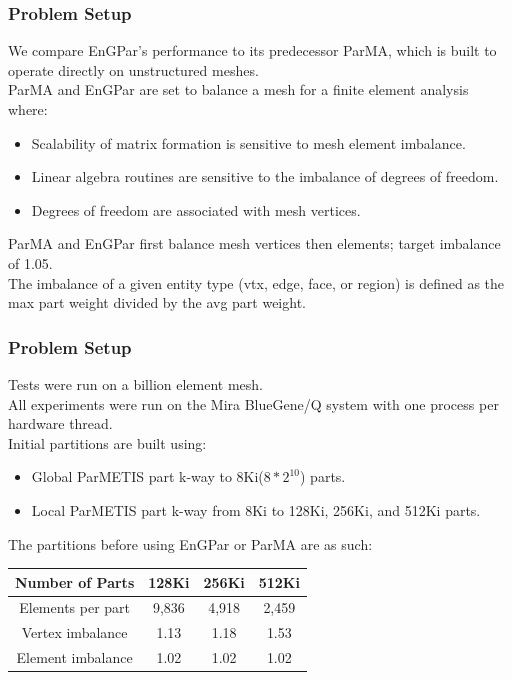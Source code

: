 \documentclass{beamer}
\begin{document}
\begin{frame}
  \frametitle{Problem Setup}
  We compare EnGPar's performance to its predecessor ParMA, which is built to operate directly on unstructured meshes.\\
  \medskip
  ParMA and EnGPar are set to balance a mesh for a finite element analysis where:
  \begin{itemize}
  \item Scalability of matrix formation is sensitive to mesh element imbalance.
  \item Linear algebra routines are sensitive to the imbalance of degrees of freedom.
  \item Degrees of freedom are associated with mesh vertices.
  \end{itemize}
  \bigskip
  ParMA and EnGPar first balance mesh vertices then elements;
  target imbalance of 1.05. \\
  The imbalance of a given entity type (vtx, edge, face, or region) is defined as the 
  max part weight divided by the avg part weight.
\end{frame}

\begin{frame}
  \frametitle{Problem Setup}
  \medskip
  Tests were run on a billion element mesh. \\
  All experiments were run on the Mira BlueGene/Q system with one process per
  hardware thread. \\
  \smallskip
  Initial partitions are built using:
  \begin{itemize}
  \item Global ParMETIS part k-way to 8Ki($8*2^{10}$) parts.
  \item Local ParMETIS part k-way from 8Ki to 128Ki, 256Ki, and 512Ki parts.
  \end{itemize}
  The partitions before using EnGPar or ParMA are as such:\\
  \begin{table}[!h]
    \centering
    \begin{tabular}{||c|c|c|c||}
      \hline
      Number of Parts &128Ki&256Ki&512Ki \\
      \hline
      Elements per part & 9,836 & 4,918&2,459  \\
      \hline
      Vertex imbalance & 1.13 & 1.18 & 1.53 \\
      \hline
      Element imbalance & 1.02& 1.02& 1.02\\
      \hline
    \end{tabular}
  \end{table}
\end{frame}
\end{document}
